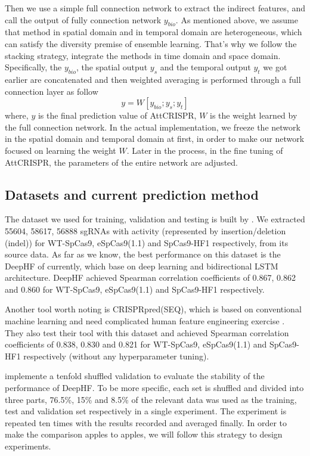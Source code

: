 \documentclass{bioinfo}
\begin{document}
Then we use a simple full connection network to extract the indirect features, and call the output of fully connection network $y_{bio}$. 
As mentioned above, we assume that method in spatial domain and in temporal domain are heterogeneous, which can satisfy the diversity premise of ensemble learning.
That's why we follow the stacking strategy, integrate the methods in time domain and space domain. 
Specifically, the $y_{bio}$, the spatial output $y_{s}$ and the temporal output $y_{t}$ we got earlier are concatenated and then weighted averaging is performed through a full connection layer as follow
\begin{equation}
y=W[y_{bio};y_s;y_t]\label{eq:20}
\end{equation}
where, $y$ is the final prediction value of AttCRISPR, $W$ is the weight learned by the full connection network. 
In the actual implementation, we freeze the network in the spatial domain and temporal domain at first, in order to make our network focused on learning the weight $W$.
Later in the process, in the fine tuning of AttCRISPR, the parameters of the entire network are adjusted.

\subsection{Datasets and current prediction method}

The dataset we used for training, validation and testing is built by \citeauthor{wang2019optimized} \citep{wang2019optimized}. 
We extracted 55604, 58617, 56888 sgRNAs with activity (represented by insertion/deletion (indel)) for WT-SpCas9, eSpCas9(1.1) and SpCas9-HF1 respectively, from its source data. 
As far as we know, the best performance on this dataset is the DeepHF of \citeauthor{wang2019optimized} currently, which base on deep learning and bidirectional LSTM architecture. 
DeepHF achieved Spearman correlation coefficients of 0.867, 0.862 and 0.860 for WT-SpCas9, eSpCas9(1.1) and SpCas9-HF1 respectively. 

Another tool worth noting is CRISPRpred(SEQ), which is based on conventional machine learning and need complicated human feature engineering exercise \citep{MuhammadRafid2020}. 
They also test their tool with this dataset and achieved Spearman correlation coefficients of 0.838, 0.830 and 0.821 for WT-SpCas9, eSpCas9(1.1) and SpCas9-HF1 respectively (without any hyperparameter tuning).

\citeauthor{wang2019optimized} implemente a tenfold shuffled validation to evaluate the stability of the performance of DeepHF.
To be more specific, each set is shuffled and divided into three parts, 76.5\%, 15\% and 8.5\% of the relevant data was used as the training, test and validation set respectively in a single experiment. 
The experiment is repeated ten times with the results recorded and averaged finally.
In order to make the comparison apples to apples, we will follow this strategy to design experiments.
\end{document}
